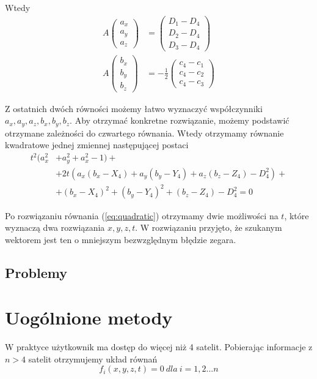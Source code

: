 \documentclass{article}
\begin{document}
\noindent Wtedy
\begin{equation}
\begin{aligned}
    A
    \begin{pmatrix}
        a_x \\ a_y \\ a_z
    \end{pmatrix}
    &=
    \begin{pmatrix}
        D_1-D_4 \\ D_2-D_4 \\ D_3-D_4
    \end{pmatrix}
    \\
    A
    \begin{pmatrix}
        b_x \\ b_y \\ b_z
    \end{pmatrix}
    &=
    -\frac{1}{2}
    \begin{pmatrix}
        c_4-c_1 \\
        c_4-c_2 \\
        c_4-c_3
    \end{pmatrix}
\end{aligned}
\end{equation}

\noindent Z ostatnich dwóch równości możemy łatwo wyznaczyć współczynniki $a_x, a_y, a_z, b_x, b_y, b_z$.
Aby otrzymać konkretne rozwiązanie, możemy podstawić otrzymane zależności do czwartego równania.
Wtedy otrzymamy równanie kwadratowe jednej zmiennej następującej postaci
\begin{equation} \label{eq:quadratic}
\begin{split}
  t^2(a_x^2&+a_y^2+a_x^2-1) + \\
  &+ 2t(a_x(b_x-X_4)+a_y(b_y-Y_4)+a_z(b_z-Z_4)-D_4^2) + \\
  &+ (b_x-X_4)^2+(b_y-Y_4)^2+(b_z-Z_4)-D_4^2 = 0
\end{split}
\end{equation}

\noindent Po rozwiązaniu równania (\ref{eq:quadratic}) otrzymamy dwie możliwości na $t$, które wyznaczą
dwa rozwiązania $x, y, z, t$. W rozwiązaniu przyjęto, że szukanym wektorem jest ten o
mniejszym bezwzględnym błędzie zegara.

\subsection{Problemy}

\section{Uogólnione metody}
W praktyce użytkownik ma dostęp do więcej niż 4 satelit. Pobierając informacje z $n > 4$ satelit otrzymujemy układ równań
$$ f_{i}(x, y, z, t) = 0 \ dla \ i = 1,2...n $$
\end{document}
